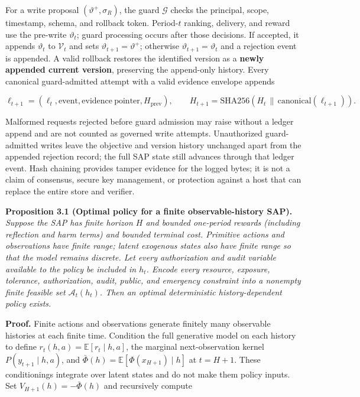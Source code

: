 \documentclass[
  11pt]{article}
\begin{document}
For a write proposal \((\vartheta^+,\sigma_R)\), the guard
\(\mathcal G\) checks the principal, scope, timestamp, schema, and
rollback token. Period-\(t\) ranking, delivery, and reward use the
pre-write \(\vartheta_t\); guard processing occurs after those
decisions. If accepted, it appends \(\vartheta_t\) to \(\mathcal V_t\)
and sets \(\vartheta_{t+1}=\vartheta^+\); otherwise
\(\vartheta_{t+1}=\vartheta_t\) and a rejection event is appended. A
valid rollback restores the identified version as a \textbf{newly
appended current version}, preserving the append-only history. Every
canonical guard-admitted attempt with a valid evidence envelope appends

\[\ell_{t+1}=(\ell_t,\mathrm{event},\mathrm{evidence\ pointer},H_{\mathrm{prev}}),\qquad
H_{t+1}=\mathrm{SHA256}(H_t\,\|\,\mathrm{canonical}(\ell_{t+1})).\tag{3}\]

Malformed requests rejected before guard admission may raise without a
ledger append and are not counted as governed write attempts.
Unauthorized guard-admitted writes leave the objective and version
history unchanged apart from the appended rejection record; the full SAP
state still advances through that ledger event. Hash chaining provides
tamper evidence for the logged bytes; it is not a claim of consensus,
secure key management, or protection against a host that can replace the
entire store and verifier.

\textbf{Proposition 3.1 (Optimal policy for a finite observable-history
SAP).} \emph{Suppose the SAP has finite horizon \(H\) and bounded
one-period rewards (including reflection and harm terms) and bounded
terminal cost. Primitive actions and observations have finite range;
latent exogenous states also have finite range so that the model remains
discrete. Let every authorization and audit variable available to the
policy be included in \(h_t\). Encode every resource, exposure,
tolerance, authorization, audit, public, and emergency constraint into a
nonempty finite feasible set \(\mathcal A_t(h_t)\). Then an optimal
deterministic history-dependent policy exists.}

\textbf{Proof.} Finite actions and observations generate finitely many
observable histories at each finite time. Condition the full generative
model on each history to define \(r_t(h,a)=\mathbb E[r_t\mid h,a]\), the
marginal next-observation kernel \(P(y_{t+1}\mid h,a)\), and
\(\bar\Phi(h)=\mathbb E[\Phi(x_{H+1})\mid h]\) at \(t=H+1\). These
conditionings integrate over latent states and do not make them policy
inputs. Set \(V_{H+1}(h)=-\bar\Phi(h)\) and recursively compute
\end{document}
